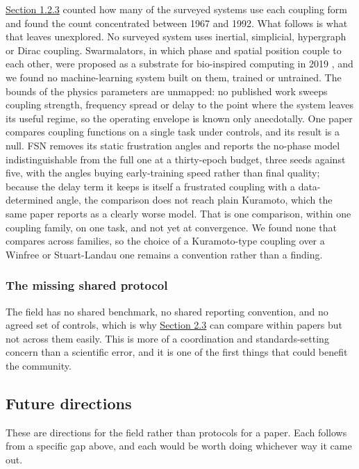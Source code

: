 \documentclass[a4paper,fleqn]{cas-sc}
\newcounter{none} %
\begin{document}
\hyperref[sec-1-2-3]{Section 1.2.3} counted how many of the surveyed
systems use each coupling form and found the count concentrated between
1967 and 1992. What follows is what that leaves unexplored. No surveyed
system uses inertial, simplicial, hypergraph or Dirac coupling.
Swarmalators, in which phase and spatial position couple to each other,
were proposed as a substrate for bio-inspired computing in 2019
\citep{o-keeffe2019}, and we found no machine-learning system built on
them, trained or untrained. The bounds of the physics parameters are
unmapped: no published work sweeps coupling strength, frequency spread
or delay to the point where the system leaves its useful regime, so the
operating envelope is known only anecdotally. One paper compares
coupling functions on a single task under controls, and its result is a
null. FSN removes its static frustration angles and reports the no-phase
model indistinguishable from the full one at a thirty-epoch budget,
three seeds against five, with the angles buying early-training speed
rather than final quality; because the delay term it keeps is itself a
frustrated coupling with a data-determined angle, the comparison does
not reach plain Kuramoto, which the same paper reports as a clearly
worse model. That is one comparison, within one coupling family, on one
task, and not yet at convergence. We found none that compares across
families, so the choice of a Kuramoto-type coupling over a Winfree or
Stuart-Landau one remains a convention rather than a finding.

\subsubsection{The missing shared protocol}\label{sec-3-1-6}

The field has no shared benchmark, no shared reporting convention, and
no agreed set of controls, which is why \hyperref[sec-2-3]{Section 2.3}
can compare within papers but not across them easily. This is more of a
coordination and standards-setting concern than a scientific error, and
it is one of the first things that could benefit the community.

\subsection{Future directions}\label{sec-3-2}

These are directions for the field rather than protocols for a paper.
Each follows from a specific gap above, and each would be worth doing
whichever way it came out.
\end{document}
